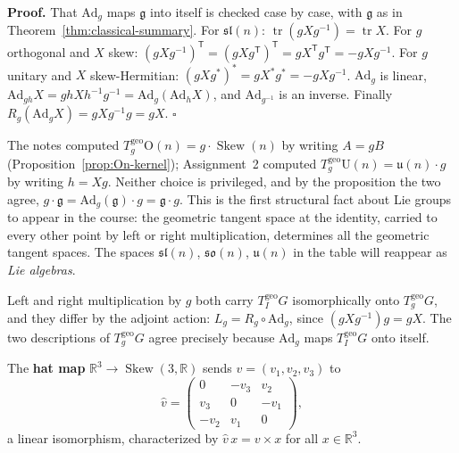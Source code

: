 \documentclass[11pt]{report}
\makeatletter
\newcounter{defcounter}[section]
\renewenvironment{proof}[1][Proof]{\noindent\textbf{#1.} }{\hfill$\square$\par\vspace{5pt}}
\newcommand{\deflabel}[1]{\edef\@currentlabel{\arabic{section}.\arabic{defcounter}}\label{#1}}
\newcommand{\Ogp}{\mathrm{O}}
\newcommand{\Ugp}{\mathrm{U}}
\DeclareMathOperator{\tr}{tr}
\DeclareMathOperator{\Skew}{Skew}
\newcommand{\geo}{\mathrm{geo}}
\makeatother
\begin{document}
\begin{proof}
That $\mathrm{Ad}_g$ maps $\mathfrak{g}$ into itself is checked case by case, with $\mathfrak{g}$ as in Theorem~\ref{thm:classical-summary}. For $\mathfrak{sl}(n)$: $\tr(gXg^{-1}) = \tr X$. For $g$ orthogonal and $X$ skew: $(gXg^{-1})^{\mathsf T} = (gXg^{\mathsf T})^{\mathsf T} = gX^{\mathsf T}g^{\mathsf T} = -gXg^{-1}$. For $g$ unitary and $X$ skew-Hermitian: $(gXg^*)^* = gX^*g^* = -gXg^{-1}$. $\mathrm{Ad}_g$ is linear, $\mathrm{Ad}_{gh}X = ghXh^{-1}g^{-1} = \mathrm{Ad}_g(\mathrm{Ad}_h X)$, and $\mathrm{Ad}_{g^{-1}}$ is an inverse. Finally $R_g(\mathrm{Ad}_g X) = gXg^{-1}g = gX$.
\end{proof}

\begin{rembox}\label{rem:left-right-translates}
The notes computed $T^{\geo}_g\Ogp(n) = g\cdot\Skew(n)$ by writing $A = gB$ (Proposition~\ref{prop:On-kernel}); Assignment~2 computed $T^{\geo}_g\Ugp(n) = \mathfrak{u}(n)\cdot g$ by writing $h = Xg$. Neither choice is privileged, and by the proposition the two agree, $g \cdot \mathfrak{g} = \mathrm{Ad}_g(\mathfrak{g}) \cdot g = \mathfrak{g} \cdot g$. This is the first structural fact about Lie groups to appear in the course: the geometric tangent space at the identity, carried to every other point by left or right multiplication, determines all the geometric tangent spaces. The spaces $\mathfrak{sl}(n)$, $\mathfrak{so}(n)$, $\mathfrak{u}(n)$ in the table will reappear as \emph{Lie algebras}.
\end{rembox}

\begin{center}
\end{center}

Left and right multiplication by $g$ both carry $T^{\geo}_IG$ isomorphically onto $T^{\geo}_gG$, and they differ by the adjoint action: $L_g = R_g \circ \mathrm{Ad}_g$, since $(gXg^{-1})g = gX$. The two descriptions of $T^{\geo}_gG$ agree precisely because $\mathrm{Ad}_g$ maps $T^{\geo}_IG$ onto itself.


\begin{defbox}\deflabel{def:hat-map}
The \textbf{hat map} $\mathbb{R}^3 \to \Skew(3,\mathbb{R})$ sends $v = (v_1, v_2, v_3)$ to
\[
\hat v = \begin{pmatrix} 0 & -v_3 & v_2 \\ v_3 & 0 & -v_1 \\ -v_2 & v_1 & 0 \end{pmatrix},
\]
a linear isomorphism, characterized by $\hat v\, x = v \times x$ for all $x \in \mathbb{R}^3$.
\end{defbox}
\end{document}
